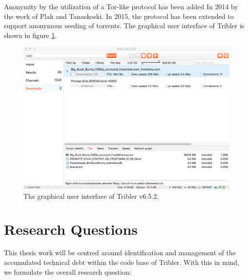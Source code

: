 Anonymity by the utilization of a Tor-like protocol has been added In 2014 by the work of  Plak\cite{plak2014anonymous} and Tanaskoski\cite{tanaskoski2014anonymous}. 
In 2015, the protocol has been extended to support anonymous seeding of torrents\cite{ruigrok2015bittorrent}.
The graphical user interface of Tribler is shown in figure \ref{fig:tribler-interface}.\\

\begin{figure}[h!]
	\centering
	\includegraphics[width=1.0\columnwidth]{images/introduction/tribler_interface}
	\caption{The graphical user interface of Tribler v6.5.2.}
	\label{fig:tribler-interface}
\end{figure}

\section{Research Questions}
This thesis work will be centred around identification and management of the accumulated technical debt within the code base of Tribler. With this in mind, we formulate the overall research question:\\

\noindent{}\\

